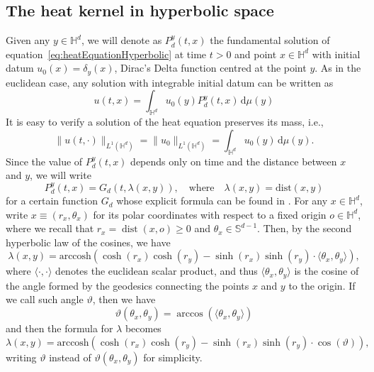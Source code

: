 \documentclass[12pt,longbibliography]{article}
\def\d{\,\mathrm{d}}
\DeclareMathOperator{\dist}{dist}
\def\d{\,\mathrm{d}}
\theoremstyle{definition}
\theoremstyle{remark}
\theoremstyle{example}
\begin{document}
\subsection{The heat kernel in hyperbolic space}
Given any $y\in \mathbb{H}^d$, we will denote as $P^y_d(t,x)$ the fundamental solution of equation~\eqref{eq:heatEquationHyperbolic} at time $t>0$ and point $x\in \mathbb{H}^d$ with initial datum $u_0(x)= \delta_y(x)$, Dirac's Delta function centred at the point $y$. As in the euclidean case, any solution with integrable initial datum can be written as
\[
u(t,x)=\int_{\mathbb{H}^d} u_0(y)P^y_d(t,x) \d\mu(y)
\]
It is easy to verify a solution of the heat equation preserves its mass, i.e.,
\[
\|u(t,\cdot)\|_{L^1(\mathbb{H}^d)} = \|u_0\|_{L^1(\mathbb{H}^d)}=\int_{\mathbb{H}^{d}} u_0(y) \d\mu(y).
\]
Since the value of $P^y_d(t,x)$ depends only on time and the distance between $x$ and $y$, we will write
\[
P^y_d(t,x) = G_d(t,\lambda(x,y)),\quad\text{where}\quad \lambda(x,y)=\text{dist}(x,y)
\]
for a certain function $G_d$ whose explicit formula can be found in \cite{Davies_1989, Grigor'yan}. For any $x\in \mathbb{H}^d$, write $x \equiv (r_x, \theta_x)$ for its polar coordinates with respect to a fixed origin $o \in \mathbb{H}^d$, where we recall that $r_x=\dist(x,o)\geq 0$ and $\theta_x\in \mathbb{S}^{d-1}$. Then, by the second hyperbolic law of the cosines, we have
\begin{equation}\label{eq:formula_lambda}
	\lambda(x,y)= \text{arccosh}(\cosh(r_x)\cosh(r_y)-\sinh(r_x)\sinh(r_y)\cdot \langle\theta_x,\theta_y\rangle),
\end{equation}
where $\langle \cdot ,\cdot \rangle$ denotes the euclidean scalar product, and thus $\langle\theta_x,\theta_y\rangle$ is the cosine of the angle formed by the geodesics connecting the points $x$ and $y$ to the origin. If we call such angle $\vartheta$, then we have
\[
\vartheta(\theta_x,\theta_y) = \arccos(\langle\theta_x,\theta_y\rangle)
\]
and then the formula for $\lambda$ becomes
\[
\lambda(x,y)= \text{arccosh}(\cosh(r_x)\cosh(r_y)-\sinh(r_x)\sinh(r_y)\cdot \cos(\vartheta)),
\]
writing $\vartheta$ instead of $\vartheta(\theta_x,\theta_y)$ for simplicity.
\end{document}
